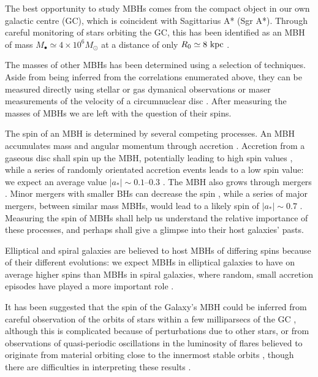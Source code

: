 The best opportunity to study MBHs comes from the compact object in our own galactic centre (GC), which is coincident with Sagittarius A* (Sgr A*). Through careful monitoring of stars orbiting the GC, this has been identified as an MBH of mass $M_\bullet \simeq 4 \times 10^6 M_\odot$ at a distance of only $R_0 \simeq 8~\mathrm{kpc}$ \citep{Gillessen2009, Meyer2012}.

The masses of other MBHs has been determined using a selection of techniques. Aside from being inferred from the correlations enumerated above, they can be measured directly using stellar or gas dymanical observations \citep[e.g.,][]{Macchetto1997,vanderMarel1998,Gebhardt2003} or maser measurements of the velocity of a circumnuclear disc \citep[e.g.,][]{Miyoshi1995}. After measuring the masses of MBHs we are left with the question of their spins.

The spin of an MBH is determined by several competing processes. An MBH accumulates mass and angular momentum through accretion \citep{Volonteri2010,King2013}. Accretion from a gaseous disc shall spin up the MBH, potentially leading to high spin values \citep{Volonteri2005}, while a series of randomly orientated accretion events leads to a low spin value: we expect an average value $|a_\ast| \sim 0.1$--$0.3$ \citep{King2006, King2008}. The MBH also grows through mergers \citep{Yu2002, Malbon2007}. Minor mergers with smaller BHs can decrease the spin \citep{Hughes2003, Gammie2004}, while a series of major mergers, between similar mass MBHs, would lead to a likely spin of $|a_\ast| \sim 0.7$ \citep{Gonzalez2007, Berti2007, Berti2008}. Measuring the spin of MBHs shall help us understand the relative importance of these processes, and perhaps shall give a glimpse into their host galaxies' pasts.

Elliptical and spiral galaxies are believed to host MBHs of differing spins because of their different evolutions: we expect MBHs in elliptical galaxies to have on average higher spins than MBHs in spiral galaxies, where random, small accretion episodes have played a more important role \citep{Volonteri2007, Sikora2007}.

It has been suggested that the spin of the Galaxy's MBH could be inferred from careful observation of the orbits of stars within a few milliparsecs of the GC \citep{Merritt2010}, although this is complicated because of perturbations due to other stars, or from observations of quasi-periodic oscillations in the luminosity of flares believed to originate from material orbiting close to the innermost stable orbits \citep{Genzel2003a, Belanger2006, Trippe2007, Hamaus2009, Kato2010}, though there are difficulties in interpreting these results \citep{Psaltis2008a}.

